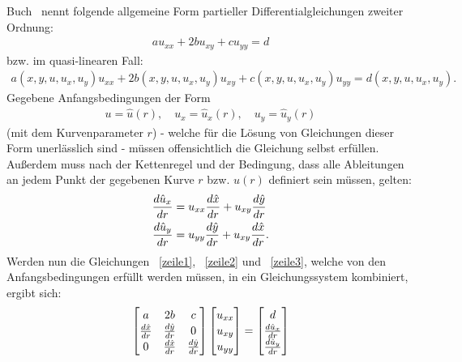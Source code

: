 Buch~\cite[S. 115]{epstein_partial_2017} nennt folgende allgemeine Form partieller Differentialgleichungen zweiter Ordnung:
\begin{align}
\label{zeile1}
    a u_{xx} + 2b u_{xy} + c u_{yy} = d
\end{align}
bzw. im quasi-linearen Fall:
\begin{align*}
    a(x,y,u,u_x,u_y) u_{xx} + 2b(x,y,u,u_x,u_y) u_{xy} + c(x,y,u,u_x,u_y) u_{yy} = d(x,y,u,u_x,u_y).
\end{align*}
Gegebene Anfangsbedingungen der Form 
\begin{align*}
    u=\hat{u}(r), \quad u_x = \hat{u}_x (r), \quad u_y = \hat{u}_y (r)
\end{align*}
(mit dem Kurvenparameter $r$) - welche für die Lösung von Gleichungen dieser Form unerlässlich sind - müssen offensichtlich die Gleichung selbst erfüllen. Außerdem muss nach der Kettenregel und der Bedingung, dass alle Ableitungen an jedem Punkt der gegebenen Kurve $r$ bzw. $\hat{u}(r)$ definiert sein müssen, gelten:
\begin{align}
\label{zeile2}
    \frac{d \hat{u}_x}{d r} &= u_{xx} \frac{d \hat{x}}{d r} + u_{xy} \frac{d \hat{y}}{d r} \\ 
\label{zeile3}
    \frac{d \hat{u}_y}{d r} &= u_{yy} \frac{d \hat{y}}{d r} + u_{xy} \frac{d \hat{x}}{d r}.
\end{align}
Werden nun die Gleichungen ~\eqref{zeile1}, ~\eqref{zeile2} und ~\eqref{zeile3}, welche von den Anfangsbedingungen erfüllt werden müssen, in ein Gleichungssystem kombiniert, ergibt sich:
\begin{align}
\label{lgs_qual}
    \renewcommand{\arraystretch}{1.15}
    \begin{bmatrix}
        a & 2b & c \\
        \diff{\hat{x}}{r} & \diff{\hat{y}}{r} & 0 \\
        0 &  \diff{\hat{x}}{r} & \diff{\hat{y}}{r} \\
    \end{bmatrix}
    \begin{bmatrix}
        u_{xx} \\
        u_{xy} \\
        u_{yy} \\
    \end{bmatrix}
    =
    \begin{bmatrix}
        d \\
        \diff{\hat{u}_x}{r} \\
        \diff{\hat{u}_y}{r}
    \end{bmatrix}
\end{align}
